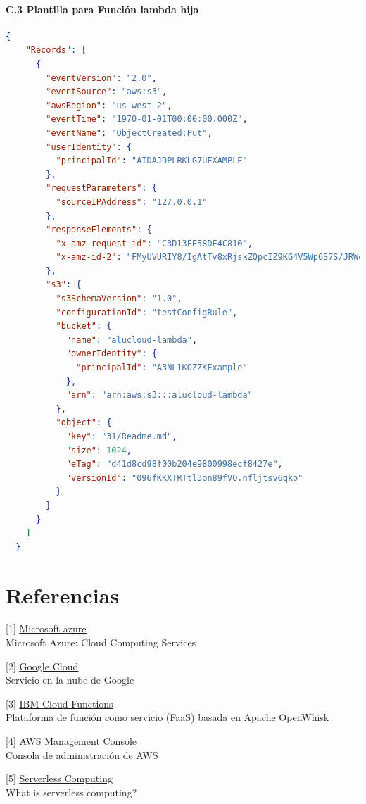 \documentclass[
]{article}
\begin{document}
\hypertarget{header-n230}{%
\paragraph{C.3 Plantilla para Función lambda hija}\label{header-n230}}
\leavevmode
\newline
\begin{lstlisting}[language=json,firstnumber=1]
{
    "Records": [
      {
        "eventVersion": "2.0",
        "eventSource": "aws:s3",
        "awsRegion": "us-west-2",
        "eventTime": "1970-01-01T00:00:00.000Z",
        "eventName": "ObjectCreated:Put",
        "userIdentity": {
          "principalId": "AIDAJDPLRKLG7UEXAMPLE"
        },
        "requestParameters": {
          "sourceIPAddress": "127.0.0.1"
        },
        "responseElements": {
          "x-amz-request-id": "C3D13FE58DE4C810",
          "x-amz-id-2": "FMyUVURIY8/IgAtTv8xRjskZQpcIZ9KG4V5Wp6S7S/JRWeUWerMUE5JgHvANOjpD"
        },
        "s3": {
          "s3SchemaVersion": "1.0",
          "configurationId": "testConfigRule",
          "bucket": {
            "name": "alucloud-lambda",
            "ownerIdentity": {
              "principalId": "A3NL1KOZZKExample"
            },
            "arn": "arn:aws:s3:::alucloud-lambda"
          },
          "object": {
            "key": "31/Readme.md",
            "size": 1024,
            "eTag": "d41d8cd98f00b204e9800998ecf8427e",
            "versionId": "096fKKXTRTtl3on89fVO.nfljtsv6qko"
          }
        }
      }
    ]
  }
\end{lstlisting}

\hypertarget{header-n233}{%
\section{Referencias}\label{header-n233}}

{[}1{]}
\underline{\href{https://docs.microsoft.com/en-us/azure/?product=featured}{Microsoft
azure}}\\
Microsoft Azure: Cloud Computing Services

{[}2{]}
\underline{\href{https://cloud.google.com}{Google Cloud}}\\
Servicio en la nube de Google

{[}3{]}
\underline{\href{https://cloud.ibm.com/functions/}{IBM Cloud Functions}}\\
Plataforma de función como servicio (FaaS) basada en Apache OpenWhisk

{[}4{]}
\underline{\href{https://aws.amazon.com/es/console/}{AWS Management Console}}\\
Consola de administración de AWS

{[}5{]}
\underline{\href{https://www.ibm.com/cloud/learn/serverless}{Serverless
Computing}}\\
What is serverless computing?
\end{document}
